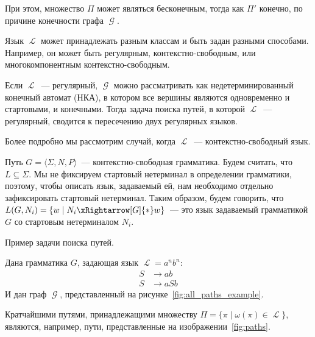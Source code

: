 При этом, множество $\Pi$ может являться бесконечным, тогда как $\Pi'$ конечно, по причине конечности графа $\mscrG$.

Язык $\mscrL$ может принадлежать разным классам и быть задан разными способами.
Например, он может быть регулярным, контекстно-свободным, или многокомпонентным контекстно-свободным.

Если $\mscrL$~--- регулярный, $\mscrG$ можно рассматривать как недетерминированный конечный автомат (НКА), в котором все вершины являются одновременно и стартовыми, и конечными.
Тогда задача поиска путей, в которой $\mscrL$~--- регулярный, сводится к пересечению двух регулярных языков.

Более подробно мы рассмотрим случай, когда $\mscrL$~--- контекстно-свободный язык.

Путь $G = \langle \Sigma, N, P \rangle$~--- контекстно-свободная грамматика.
Будем считать, что $L \subseteq \Sigma$.
Мы не фиксируем стартовый нетерминал в определении грамматики, поэтому, чтобы описать язык, задаваемый ей, нам необходимо отдельно зафиксировать стартовый нетерминал.
Таким образом, будем говорить, что $L(G,N_i) = \{ w \mid N_i \xRightarrow[G]{*} w  \}$~--- это язык задаваемый грамматикой $G$ со стартовым нетерминалом $N_i$.

\begin{example}
    Пример задачи поиска путей.

    Дана грамматика $G$, задающая язык $\mscrL = a^n b^n$:
    \begin{align*}
        S & \to a b   \\
        S & \to a S b
    \end{align*}
    И дан граф $\mscrG$, представленный на рисунке~\ref{fig:all_paths_example}.
\begin{marginfigure}
    \begin{center}
        
    \end{center}
    \caption{Входной граф}
    \label{fig:all_paths_example}
\end{marginfigure}

    Кратчайшими путями, принадлежащими множеству $\Pi = \{\pi \mid \omega(\pi) \in \mscrL\}$, являются, например, пути, представленные на изображении~\ref{fig:paths}.

\begin{marginfigure}
    \begin{center}
        
        
    \end{center}
    \caption{Примеры путей}
    \label{fig:paths}
\end{marginfigure}

\end{example}


